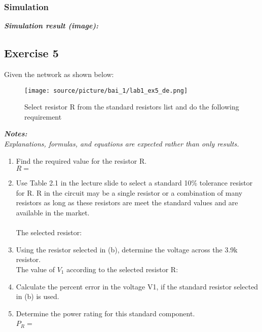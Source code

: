 \subsubsection{Simulation}
\textit{\textbf{Simulation result (image):}}
\newpage

\subsection{Exercise 5}
Given the network as shown below:

\begin{figure}[H]
    \centering
    \texttt{[image: source/picture/bai\_1/lab1\_ex5\_de.png]}
    \caption{Select resistor R from the standard resistors list and do the following requirement}
    \label{lab1_ex5_de}
\end{figure}

\textit{\textbf{Notes:}}\\
\textit{Explanations, formulas, and equations are expected rather than only results.}\\

\begin{enumerate}[label=\alph*.]
    \item Find the required value for the resistor R.\bigskip\\
    $R = $\dotfill\medskip
    \item Use Table 2.1 in the lecture slide to select a standard 10\% tolerance resistor for R. R in the circuit may be a single resistor or a combination of many resistors as long as these resistors are meet the standard values and are available in the market.\bigskip\\
    \\
    The selected resistor:\dotfill
    \dotfill\bigskip\par\mbox{}\dotfill
    \item Using the resistor selected in (b), determine the voltage across the 3.9k resistor.\bigskip\\
    The value of $V_1$ according to the selected resistor R:\dotfill
    \dotfill\bigskip\par\mbox{}\dotfill
    \item Calculate the percent error in the voltage V1, if the standard resistor selected in (b) is used.\\
    \dotfill\par\mbox{}\dotfill
    \item Determine the power rating for this standard component.\bigskip\\
    $P_R =$\dotfill\
\end{enumerate}

